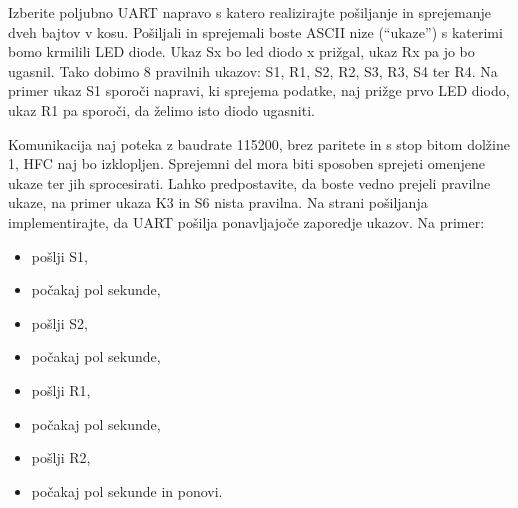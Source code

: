 \documentclass[12pt,letterpaper]{article}
\begin{document}
Izberite poljubno UART napravo s katero realizirajte pošiljanje in sprejemanje dveh bajtov v kosu. Pošiljali in sprejemali boste ASCII nize (``ukaze'') s katerimi bomo krmilili LED diode. Ukaz Sx bo led diodo x prižgal, ukaz Rx pa jo bo ugasnil. Tako dobimo 8 pravilnih ukazov: S1, R1, S2, R2, S3, R3, S4 ter R4. Na primer ukaz S1 sporoči napravi, ki sprejema podatke, naj prižge prvo LED diodo, ukaz R1 pa sporoči, da želimo isto diodo ugasniti.

Komunikacija naj poteka z baudrate 115200, brez paritete in s stop bitom dolžine 1, HFC naj bo izklopljen. Sprejemni del mora biti sposoben sprejeti omenjene ukaze ter jih sprocesirati. Lahko predpostavite, da boste vedno prejeli pravilne ukaze, na primer ukaza K3 in S6 nista pravilna. Na strani pošiljanja implementirajte, da UART pošilja ponavljajoče zaporedje ukazov. Na primer:

\begin{itemize}
    \item pošlji S1,
    \item počakaj pol sekunde,
    \item pošlji S2,
    \item počakaj pol sekunde,
    \item pošlji R1,
    \item počakaj pol sekunde,
    \item pošlji R2,
    \item počakaj pol sekunde in ponovi.
\end{itemize}
\end{document}
